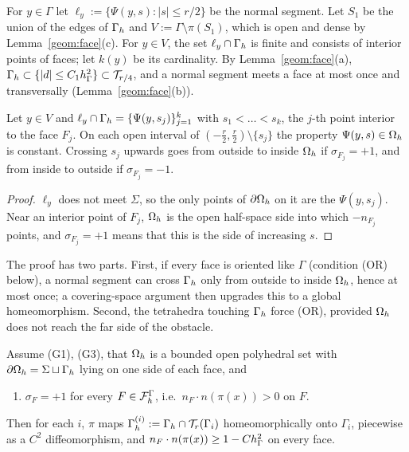 For $y\in\Gamma$ let $\ell_y:=\{\Psi(y,s):|s|\le r/2\}$ be the normal segment. Let $S_1$ be the union of the edges of $\Gamma_h$ and $V:=\Gamma\setminus\pi(S_1)$, which is open and dense by Lemma~\ref{geom:face}(c). For $y\in V$, the set $\ell_y\cap\Gamma_h$ is finite and consists of interior points of faces; let $k(y)$ be its cardinality. By Lemma~\ref{geom:face}(a), $\Gamma_h\subset\{|d|\le C_1h_\Gamma^2\}\subset\mathcal T_{r/4}$, and a normal segment meets a face at most once and transversally (Lemma~\ref{geom:face}(b)).

\begin{lemma}\label{geom:cross}
Let $y\in V$ and $\ell_y\cap\Gamma_h=\{\Psi(y,s_j)\}_{j=1}^k$ with $s_1<\dots<s_k$, the $j$-th point interior to the face $F_j$. On each open interval of $(-\frac r2,\frac r2)\setminus\{s_j\}$ the property $\Psi(y,s)\in\Omega_h$ is constant. Crossing $s_j$ upwards goes from outside to inside $\Omega_h$ if $\sigma_{F_j}=+1$, and from inside to outside if $\sigma_{F_j}=-1$.
\end{lemma}

\begin{proof}
$\ell_y$ does not meet $\Sigma$, so the only points of $\partial\Omega_h$ on it are the $\Psi(y,s_j)$. Near an interior point of $F_j$, $\Omega_h$ is the open half-space side into which $-n_{F_j}$ points, and $\sigma_{F_j}=+1$ means that this is the side of increasing $s$.
\end{proof}

The proof has two parts. First, if every face is oriented like $\Gamma$ (condition (OR) below), a normal segment can cross $\Gamma_h$ only from outside to inside $\Omega_h$, hence at most once; a covering-space argument then upgrades this to a global homeomorphism. Second, the tetrahedra touching $\Gamma_h$ force (OR), provided $\Omega_h$ does not reach the far side of the obstacle.

\begin{theorem}\label{geom:orient}
Assume (G1), (G3), that $\Omega_h$ is a bounded open polyhedral set with $\partial\Omega_h=\Sigma\sqcup\Gamma_h$ lying on one side of each face, and
\begin{enumerate}[label=(OR)]
\item $\sigma_F=+1$ for every $F\in\mathcal F_h^\Gamma$, i.e.\ $n_F\cdot n(\pi(x))>0$ on $F$.
\end{enumerate}
Then for each $i$, $\pi$ maps $\Gamma_h^{(i)}:=\Gamma_h\cap\mathcal T_r(\Gamma_i)$ homeomorphically onto $\Gamma_i$, piecewise as a $C^2$ diffeomorphism, and $n_F\cdot n(\pi(x))\ge1-Ch_\Gamma^2$ on every face.
\end{theorem}


